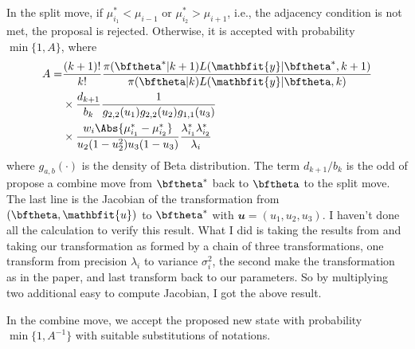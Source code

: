 \documentclass[11pt, bib, fontset = Minion]{marticle}
\def\by{\mathbfit{y}}
\def\bu{\mathbfit{u}}
\begin{document}
  In the split move, if $\mu_{i_1}^* < \mu_{i - 1}$ or
  $\mu_{i_2}^* > \mu_{i + 1}$, i.e., the adjacency condition is not
  met, the proposal is rejected. Otherwise, it is accepted with probability
  $\min\{1, A\}$, where
  \begin{align}
    A =& \frac{(k + 1)!}{k!}
    \frac{\pi(\bftheta^*|k + 1)L(\by|\bftheta^*,k + 1)}
    {\pi(\bftheta|k)L(\by|\bftheta,k)} \notag\\
    &\times\frac{d_{k+1}}{b_k}
    \frac{1}{g_{2,2}(u_1)g_{2,2}(u_2)g_{1,1}(u_3)} \notag\\
    &\times\frac{w_i\Abs{\mu_{i_1}^* - \mu_{i_2}^*}}
    {u_2(1 - u_2^2)u_3(1 - u_3)}
    \frac{\lambda_{i_1}^*\lambda_{i_2}^*}{\lambda_i}
  \end{align}
  where $g_{a,b}(\cdot)$ is the density of Beta distribution. The term
  $d_{k+1}/b_k$ is the odd of propose a combine move from $\bftheta^*$ back to
  $\bftheta$ to the split move. The last line is the Jacobian of the
  transformation from $(\bftheta,\bu)$ to $\bftheta^*$ with $\bu = (u_1, u_2,
  u_3)$. I haven't done all the calculation to verify this result. What I did
  is taking the results from \textcite{Richardson:1997ea} and taking our
  transformation as formed by a chain of three transformations, one transform
  from precision $\lambda_i$ to variance $\sigma_i^2$, the second make the
  transformation as in the paper, and last transform back to our parameters.
  So by multiplying two additional easy to compute Jacobian, I got the above
  result.

  In the combine move, we accept the proposed new state with probability
  $\min\{1,A^{-1}\}$ with suitable substitutions of notations.

  \printbibliography
\end{document}
